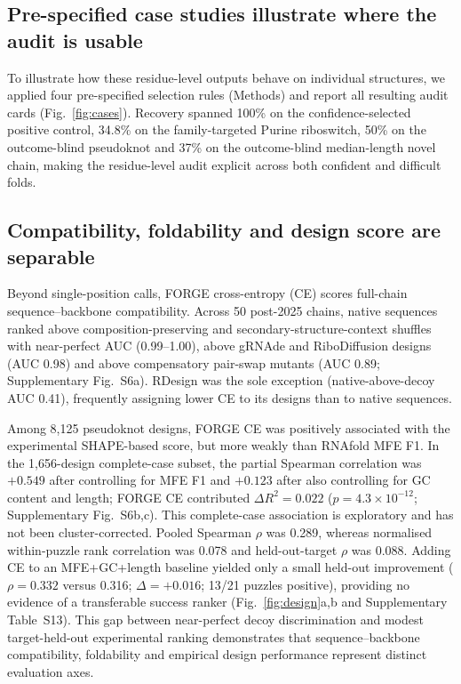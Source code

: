 \subsection{Pre-specified case studies illustrate where the audit is usable}
\label{sec:cases}

To illustrate how these residue-level outputs behave on individual structures, we applied four pre-specified selection rules (Methods) and report all resulting audit cards (Fig.~\ref{fig:cases}). Recovery spanned 100\% on the confidence-selected positive control, 34.8\% on the family-targeted Purine riboswitch, 50\% on the outcome-blind pseudoknot and 37\% on the outcome-blind median-length novel chain, making the residue-level audit explicit across both confident and difficult folds.

\subsection{Compatibility, foldability and design score are separable}

Beyond single-position calls, FORGE cross-entropy (CE) scores full-chain sequence--backbone compatibility. Across 50 post-2025 chains, native sequences ranked above composition-preserving and secondary-structure-context shuffles with near-perfect AUC (0.99--1.00), above gRNAde and RiboDiffusion designs (AUC 0.98) and above compensatory pair-swap mutants (AUC 0.89; Supplementary Fig.~S6a). RDesign was the sole exception (native-above-decoy AUC 0.41), frequently assigning lower CE to its designs than to native sequences. 


Among 8,125 pseudoknot designs, FORGE CE was positively associated with the
experimental SHAPE-based score, but more weakly than RNAfold MFE F1. In the 1,656-design complete-case subset, the partial Spearman correlation was $+0.549$ after controlling for MFE F1 and $+0.123$ after also controlling for GC content and length; FORGE CE contributed $\Delta R^2=0.022$ ($p=4.3\times10^{-12}$; Supplementary Fig.~S6b,c). This complete-case association is exploratory and has not been cluster-corrected. Pooled Spearman $\rho$ was 0.289, whereas normalised within-puzzle rank correlation was 0.078
and held-out-target $\rho$ was 0.088. Adding CE to an MFE+GC+length baseline yielded only a small
held-out improvement ($\rho=0.332$ versus 0.316; $\Delta=+0.016$; 13/21 puzzles positive), providing
no evidence of a transferable success ranker (Fig.~\ref{fig:design}a,b and Supplementary Table~S13).
This gap between near-perfect decoy discrimination and modest target-held-out experimental ranking demonstrates that sequence--backbone compatibility, foldability and empirical design performance represent distinct evaluation axes.

